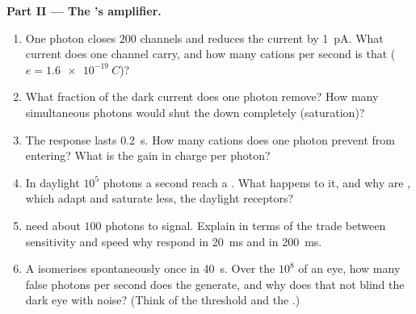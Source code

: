 \begin{problem}
\medskip
\noindent\textbf{Part II --- The 's amplifier.}
\begin{enumerate}[resume]
  \item One photon closes $200$ channels and reduces the current by
        \qty{1}{pA}. What current does one channel carry, and how many
        cations per second is that ($e = \qty{1.6e-19}{C}$)?
  \item What fraction of the dark current does one photon remove? How
        many simultaneous photons would shut the  down completely
        (saturation)?
  \item The response lasts \qty{0.2}{s}. How many cations does one
        photon prevent from entering? What is the gain in charge per
        photon?
  \item In daylight $10^{5}$ photons a second reach a . What happens
        to it, and why are , which adapt and saturate less, the
        daylight receptors?
  \item {} need about $100$ photons to signal. Explain in terms of
        the trade between sensitivity and speed why  respond in
        \qty{20}{ms} and  in \qty{200}{ms}.
  \item A  isomerises spontaneously once in \qty{40}{s}. Over
        the $10^{8}$  of an eye, how many false photons per second
        does the  generate, and why does that not blind the dark
        eye with noise? (Think of the threshold and the .)
\end{enumerate}


\end{problem}
